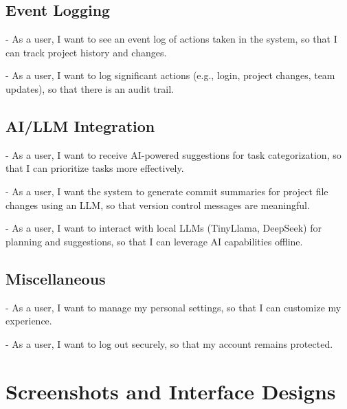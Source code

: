 \documentclass{report}
\begin{document}
\section{Event Logging}
- As a user, I want to see an event log of actions taken in the system, so that I can track project history and changes.

- As a user, I want to log significant actions (e.g., login, project changes, team updates), so that there is an audit trail.

\section{AI/LLM Integration}
- As a user, I want to receive AI-powered suggestions for task categorization, so that I can prioritize tasks more effectively.

- As a user, I want the system to generate commit summaries for project file changes using an LLM, so that version control messages are meaningful.

- As a user, I want to interact with local LLMs (TinyLlama, DeepSeek) for planning and suggestions, so that I can leverage AI capabilities offline.

\section{Miscellaneous}
- As a user, I want to manage my personal settings, so that I can customize my experience.

- As a user, I want to log out securely, so that my account remains protected.

\chapter{Screenshots and Interface Designs}
\end{document}
